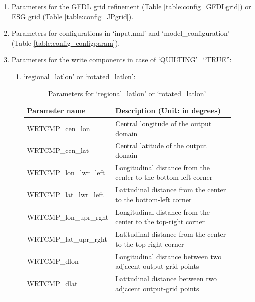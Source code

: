 \documentclass[11pt,fleqn]{report}              %
\begin{document}
\begin{enumerate}
\item Parameters for the GFDL grid refinement (Table \ref{table:config_GFDLgrid}) or ESG grid (Table \ref{table:config_JPgrid}).
\item Parameters for configurations in `input.nml' and `model\_configuration' (Table \ref{table:config_configparam}).
\item Parameters for the write components in case of `QUILTING'=``TRUE'':
\begin{enumerate}
\item `regional\_latlon' or `rotated\_latlon':
{
\fontsize{10}{12}\selectfont
\begin{longtable}{ p{0.26\linewidth} | p{0.65\linewidth}   }
\hline
\hline
 Parameter name & Description (Unit: in degrees)\\
\hline
 WRTCMP\_cen\_lon & Central longitude of the output domain \\
 WRTCMP\_cen\_lat & Central latitude of the output domain \\
 WRTCMP\_lon\_lwr\_left & Longitudinal distance from the center to the bottom-left corner \\
 WRTCMP\_lat\_lwr\_left & Latitudinal distance from the center to the bottom-left corner \\
 WRTCMP\_lon\_upr\_rght & Longitudinal distance from the center to the top-right corner \\
 WRTCMP\_lat\_upr\_rght & Latitudinal distance from the center to the top-right corner \\
 WRTCMP\_dlon & Longitudinal distance between two adjacent output-grid points \\
 WRTCMP\_dlat & Latitudinal distance between two adjacent output-grid points \\
\hline
\caption{Parameters for `regional\_latlon' or `rotated\_latlon'}
\label{table:gridpara_rotated}
\end{longtable}
}


\end{enumerate}
\end{enumerate}
\end{document}
